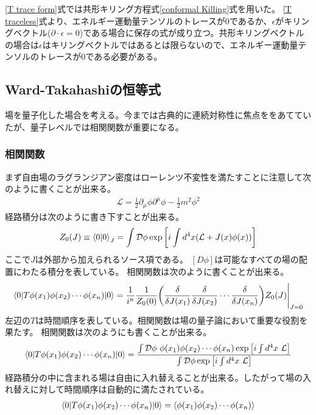 \documentclass[11pt, dvipdfmx]{article}
\numberwithin{equation}{section}
\begin{document}
\eqref{T trace form}式では共形キリング方程式\eqref{conformal Killing}式を用いた。
\eqref{T traceless}式より、エネルギー運動量テンソルのトレースが0であるか、$\epsilon$がキリングベクトル($\partial \cdot \epsilon=0$)である場合に保存の式が成り立つ。共形キリングベクトルの場合は$\epsilon$はキリングベクトルではあるとは限らないので、エネルギー運動量テンソルのトレースが0である必要がある。
\subsection{Ward-Takahashiの恒等式}
場を量子化した場合を考える。今までは古典的に連続対称性に焦点ををあてていたが、量子レベルでは相関関数が重要になる。
\subsubsection{相関関数}
まず自由場のラグランジアン密度はローレンツ不変性を満たすことに注意して次のように書くことが出来る。
\begin{align}
    \mathcal{L}=\frac{1}{2}\partial_\mu \phi \partial^\mu \phi - \frac{1}{2}m^2 \phi^2
\end{align}
経路積分は次のように書き下すことが出来る。
\begin{align}
    Z_0(J)\equiv \braket{0}{0}_J=\int \mathcal{D}\phi \exp\qty[i\int d^4x \qty(\mathcal{L}+J(x)\phi(x))]
\end{align}    
ここで$J$は外部から加えられるソース項である。
$[D\phi]$は可能なすべての場の配置にわたる積分を表している。
相関関数は次のように書くことが出来る。
\begin{align}
    \mel**{0}{T\phi(x_1)\phi(x_2)\cdots \phi(x_n)}{0}=\frac{1}{i^n}\frac{1}{Z_0(0)}\qty(\frac{\delta}{\delta J(x_1)}\frac{\delta}{\delta J(x_2)}\cdots \frac{\delta}{\delta J(x_n)})Z_0(J)\Bigg|_{J=0}
\end{align}
左辺の$T$は時間順序を表している。相関関数は場の量子論において重要な役割を果たす。
相関関数は次のようにも書くことが出来る。
\begin{align}
    \mel**{0}{T\phi(x_1)\phi(x_2)\cdots \phi(x_n)}{0}=\frac{\int \mathcal{D}\phi \ \phi(x_1)\phi(x_2)\cdots \phi(x_n) \exp\qty[i\int d^4x \ \mathcal{L}]}{\int \mathcal{D}\phi \exp\qty[i\int d^4x \ \mathcal{L}]}
\end{align}
経路積分の中に含まれる場は自由に入れ替えることが出来る。したがって場の入れ替えに対して時間順序は自動的に満たされている。
\begin{align}
      \mel**{0}{T\phi(x_1)\phi(x_2)\cdots \phi(x_n)}{0}=\ev{\phi(x_1)\phi(x_2)\cdots \phi(x_n)}
\end{align}
\end{document}

